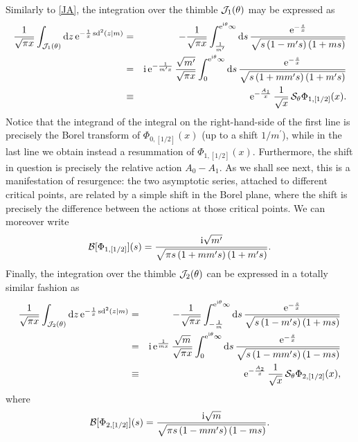 \documentclass[11pt,a4paper]{article}
\newcommand{\CB}{{\cal B}}
\newcommand{\CJ}{{\cal J}}
\newcommand{\CS}{{\cal S}}
\newcommand{\be}{\begin{equation}}
\newcommand{\ee}{\end{equation}}
\newcommand{\rme}{{\mathrm{e}}}
\newcommand{\rmi}{{\mathrm{i}}}
\newcommand{\rmd}{{\mathrm{d}}}
\begin{document}
Similarly to \eqref{JA}, the integration over the thimble $\CJ_1(\theta)$ may be expressed as 
%
\begin{eqnarray}
\frac{1}{\sqrt{\pi x}} \int_{\CJ_1(\theta)} \rmd z\, \rme^{-\frac{1}{x}\, \mathrm{sd}^2 (z | m)} &=& - \frac{1}{\sqrt{\pi x}} \int_{\frac{1}{m^\prime}}^{\rme^{\rmi\theta}\infty} \rmd s\, \frac{\rme^{-\frac{s}{x}}}{\sqrt{s \left( 1 - m^\prime s \right) \left( 1 + m s \right)}} \nonumber \\
&=& \rmi\, \rme^{-\frac{1}{m^\prime x}}\, \frac{\sqrt{m^\prime}}{\sqrt{\pi x}}  \int_0^{\rme^{\rmi\theta} \infty} \rmd s\, \frac{\rme^{-\frac{s}{x}}}{\sqrt{s \left( 1 + m m^\prime s \right) \left( 1 + m^\prime s \right)}} \nonumber \\
&\equiv& \rme^{-\frac{A_1}{x}}\, \frac{1}{\sqrt{x}}\, \CS_\theta \Phi_{1,[1/2]} (x). 
\end{eqnarray}
%
\noindent
Notice that the integrand of the integral on the right-hand-side of the first line is precisely the Borel transform of $\Phi_{0,[1/2]}(x)$ (up to a shift $1/m^\prime$), while in the last line we obtain instead a resummation of $\Phi_{1,[1/2]}(x)$. Furthermore, the shift in question is precisely the relative action $A_0-A_1$. As we shall see next, this is a manifestation of resurgence: the two asymptotic series, attached to different critical points, are related by a simple shift in the Borel plane, where the shift is precisely the difference between the actions at those critical points. We can moreover write
%
\be
\CB [\Phi_{1,[1/2]}] (s) = \frac{\rmi \sqrt{m^\prime}}{\sqrt{\pi s \left( 1 + m m^\prime s \right) \left( 1 + m^\prime s \right)}}.
\ee
%
\noindent
Finally, the  integration over the thimble $\CJ_2(\theta)$ can be expressed in a totally similar fashion as
%
\begin{eqnarray}
\frac{1}{\sqrt{\pi x}} \int_{\CJ_2(\theta)} \rmd z\, \rme^{-\frac{1}{x}\, \mathrm{sd}^2 (z | m)} &=& - \frac{1}{\sqrt{\pi x}} \int_{-\frac{1}{m}}^{\rme^{\rmi\theta} \infty} \rmd s\, \frac{\rme^{-\frac{s}{x}}}{\sqrt{s \left( 1 - m^\prime s \right) \left( 1 + m s \right)}} \nonumber \\
&=& \rmi\, \rme^{\frac{1}{m x}}\, \frac{\sqrt{m}}{\sqrt{\pi x}} \int_0^{\rme^{\rmi\theta} \infty} \rmd s\, \frac{\rme^{-\frac{s}{x}}}{\sqrt{s \left( 1 - m m^\prime s \right) \left( 1 - m s \right)}} \nonumber \\
&\equiv& \rme^{-\frac{A_2}{x}}\, \frac{1}{\sqrt{x}}\, \CS_\theta \Phi_{2,[1/2]} (x),
\end{eqnarray}
%
\noindent
where
%
\be
\CB [\Phi_{2,[1/2]}] (s) = \frac{\rmi \sqrt{m}}{\sqrt{\pi s \left( 1 - m m^\prime s \right) \left( 1 - m s \right)}}.
\ee
\end{document}
